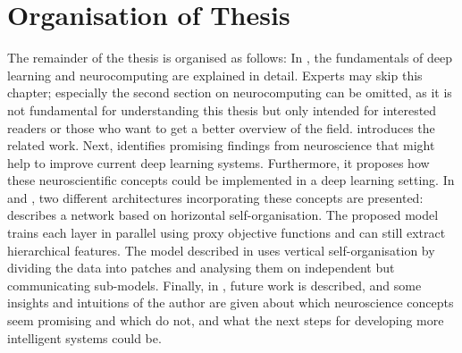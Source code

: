 \section{Organisation of Thesis}
The remainder of the thesis is organised as follows: In , the fundamentals of deep learning and neurocomputing are explained in detail.
Experts may skip this chapter; especially the second section on neurocomputing can be omitted, as it is not fundamental for understanding this thesis but only intended for interested readers or those who want to get a better overview of the field.
 introduces the related work. Next,  identifies promising findings from neuroscience that might help to improve current deep learning systems. Furthermore, it proposes how these neuroscientific concepts could be implemented in a deep learning setting.
In  and , two different architectures incorporating these concepts are presented:
 describes a network based on horizontal self-organisation. The proposed model trains each layer in parallel using proxy objective functions and can still extract hierarchical features.
The model described in  uses vertical self-organisation by dividing the data into patches and analysing them on independent but communicating sub-models.
Finally, in , future work is described, and some insights and intuitions of the author are given about which neuroscience concepts seem promising and which do not, and what the next steps for developing more intelligent systems could be.



